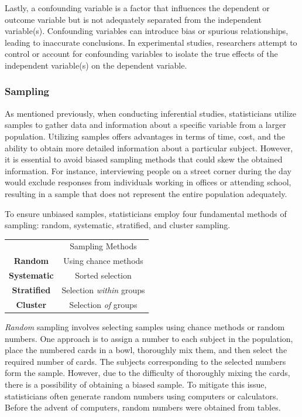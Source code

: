\documentclass{article}
\begin{document}
Lastly, a confounding variable is a factor that influences the dependent or outcome variable but is not adequately separated from the independent variable(s). Confounding variables can introduce bias or spurious relationships, leading to inaccurate conclusions. In experimental studies, researchers attempt to control or account for confounding variables to isolate the true effects of the independent variable(s) on the dependent variable.

\subsubsection{Sampling}

As mentioned previously, when conducting inferential studies, statisticians utilize samples to gather data and information about a specific variable from a larger population. Utilizing samples offers advantages in terms of time, cost, and the ability to obtain more detailed information about a particular subject. However, it is essential to avoid biased sampling methods that could skew the obtained information. For instance, interviewing people on a street corner during the day would exclude responses from individuals working in offices or attending school, resulting in a sample that does not represent the entire population adequately.

To ensure unbiased samples, statisticians employ four fundamental methods of sampling: random, systematic, stratified, and cluster sampling.

\begin{margintable}
\begin{tabular}{cc} 
    & Sampling Methods \\
    \textbf{Random} & Using chance methods \\
    \textbf{Systematic} & Sorted selection \\
    \textbf{Stratified} & Selection \emph{within} groups \\
    \textbf{Cluster} & Selection \emph{of} groups
\end{tabular}
\end{margintable}

\emph{Random} sampling involves selecting samples using chance methods or random numbers. One approach is to assign a number to each subject in the population, place the numbered cards in a bowl, thoroughly mix them, and then select the required number of cards. The subjects corresponding to the selected numbers form the sample. However, due to the difficulty of thoroughly mixing the cards, there is a possibility of obtaining a biased sample. To mitigate this issue, statisticians often generate random numbers using computers or calculators. Before the advent of computers, random numbers were obtained from tables.
\end{document}
